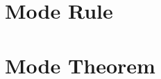 \documentclass[master.tex]{subfiles}
\begin{document}








\section{Mode Rule}
\section{Mode Theorem}


\end{document}
